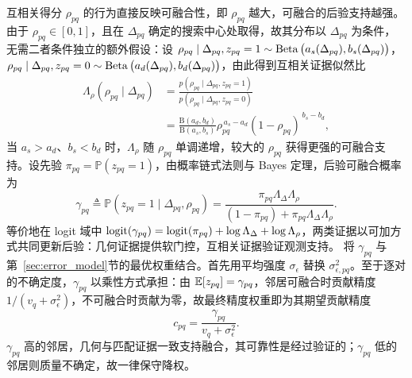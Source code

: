 互相关得分 $\rho_{pq}$ 的行为直接反映可融合性，即 $\rho_{pq}$ 越大，可融合的后验支持越强。由于 $\rho_{pq}\in[0,1]$，且在 $\Delta_{pq}$ 确定的搜索中心处取得，故其分布以 $\Delta_{pq}$ 为条件，无需二者条件独立的额外假设：设 $\rho_{pq}\mid\Delta_{pq},z_{pq}=1\sim\operatorname{Beta}\big(a_s(\Delta_{pq}),b_s(\Delta_{pq})\big)$，$\rho_{pq}\mid\Delta_{pq},z_{pq}=0\sim\operatorname{Beta}\big(a_d(\Delta_{pq}),b_d(\Delta_{pq})\big)$，由此得到互相关证据似然比
\begin{equation}
\begin{aligned}
  \Lambda_{\rho}(\rho_{pq}\mid\Delta_{pq})
  &=\frac{p(\rho_{pq}\mid\Delta_{pq},z_{pq}{=}1)}
         {p(\rho_{pq}\mid\Delta_{pq},z_{pq}{=}0)}\\
  &=\frac{\mathrm B(a_d,b_d)}{\mathrm B(a_s,b_s)}
  \rho_{pq}^{\,a_s-a_d}(1-\rho_{pq})^{\,b_s-b_d},
\end{aligned}
\label{eq:lambda_rho}
\end{equation}
当 $a_s>a_d$、$b_s<b_d$ 时，$\Lambda_{\rho}$ 随 $\rho_{pq}$ 单调递增，较大的 $\rho_{pq}$ 获得更强的可融合支持。设先验 $\pi_{pq}=\mathbb{P}(z_{pq}=1)$，由概率链式法则与 Bayes 定理，后验可融合概率为
\begin{equation}
  \gamma_{pq}\triangleq\mathbb{P}(z_{pq}=1\mid\Delta_{pq},\rho_{pq})
  =\frac{\pi_{pq}\Lambda_{\Delta}\Lambda_{\rho}}
  {(1-\pi_{pq})+\pi_{pq}\Lambda_{\Delta}\Lambda_{\rho}}.
  \label{eq:gamma}
\end{equation}
等价地在 logit 域中 $\operatorname{logit}(\gamma_{pq})=\operatorname{logit}(\pi_{pq})+\log\Lambda_{\Delta}+\log\Lambda_{\rho}$，两类证据以可加方式共同更新后验：几何证据提供软门控，互相关证据验证观测支持。
将 $\gamma_{pq}$ 与第~\ref{sec:error_model}节的最优权重结合。首先用平均强度 $\sigma_\epsilon$ 替换 $\sigma_{\epsilon,pq}^2$。至于逐对的不确定度，$\gamma_{pq}$ 以乘性方式承担：由 $\mathbb{E}[z_{pq}]=\gamma_{pq}$，邻居可融合时贡献精度 $1/(v_q+\sigma_\epsilon^2)$，不可融合时贡献为零，故最终精度权重即为其期望贡献精度
\begin{equation}
  c_{pq}=\frac{\gamma_{pq}}{v_q + \sigma_\epsilon^{2}}.
  \label{eq:final_weight}
\end{equation}$\gamma_{pq}$ 高的邻居，几何与匹配证据一致支持融合，其可靠性是经过验证的；$\gamma_{pq}$ 低的邻居则质量不确定，故一律保守降权。
